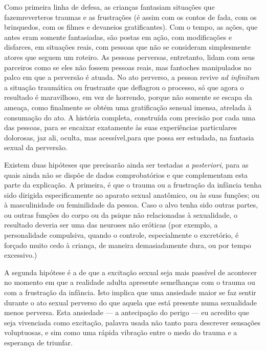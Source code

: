 Como primeira linha de defesa, as crianças fantasiam situações que
fazem\idxtraumareve[|(] reverter\idxfantareve[|(] os traumas e as frustrações (é assim com os contos de
fada, com os brinquedos, com os filmes e devaneios gratificantes). Com
o tempo, as ações, que antes eram somente fantasiadas, são postas em
ação, com modificações e disfarces, em situações reais, com pessoas que
não se consideram simplesmente atores que seguem um roteiro. As pessoas
perversas, entretanto, lidam com seus parceiros como se eles não fossem
pessoas reais,\idxdesu{} mas fantoches manipulados no palco em que a perversão é
atuada. No ato perverso,\idxtraumaobje{} a pessoa revive \textit{ad infinitum} a
situação traumática ou frustrante que deflagrou o processo, só que
agora o resultado é maravilhoso, em vez de horrendo, porque não
somente se escapa da ameaça, como finalmente se obtém uma gratificação
sensual imensa, atrelada à consumação do ato. A história completa,
construída com precisão por cada uma das pessoas, para se encaixar
exatamente às suas experiências particulares dolorosas, jaz ali,
oculta, mas acessível,\idxtraumareve[|)] para que possa ser estudada, na fantasia sexual
da perversão.

Existem duas hipóteses que precisarão ainda ser testadas
\textit{a posteriori}, para as quais ainda não se dispõe de dados
comprobatórios e que complementam esta parte da explicação. A
primeira, é que o trauma ou a frustração da infância tenha sido
dirigida especificamente ao aparato sexual anatômico, ou às suas
funções; ou à masculinidade ou feminilidade da pessoa. Caso o alvo
tenha sido outras partes, ou outras funções do corpo ou da psique não
relacionadas à sexualidade, o resultado deveria ser uma das neuroses
não eróticas (por exemplo, a personalidade compulsiva, quando o
controle, especialmente o excretório, é forçado muito cedo à criança,
de maneira demasiadamente dura, ou por tempo excessivo.)

A segunda hipótese é a de que a excitação sexual seja mais passível
de acontecer no momento em que a realidade adulta apresente semelhanças
com o trauma ou com a frustração\idxsexueang{} da infância.\idxangu{} Isto implica que uma
ansiedade maior se faz sentir durante o ato sexual perverso do que
aquela que está presente numa sexualidade menos perversa. Esta
ansiedade --- a antecipação do perigo --- eu acredito que seja
vivenciada como excitação, palavra usada não tanto para descrever
sensações voluptuosas, e sim como uma rápida vibração entre o medo do
trauma e a esperança de triunfar.

